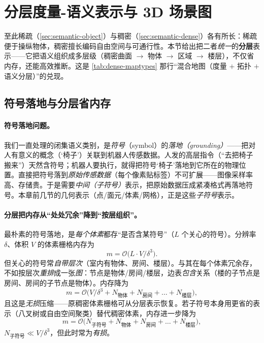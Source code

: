 \section{分层度量-语义表示与 3D 场景图}
\label{sec:semantic-graph}

至此稀疏（\cref{sec:semantic-object}）与稠密（\cref{sec:semantic-dense}）各有所长：稀疏便于操纵物体，稠密擅长编码自由空间与可通行性。本节给出把二者\emph{统一}的\textbf{分层}表示——它把语义组织成多层级（稠密曲面 $\to$ 物体 $\to$ 区域 $\to$ 楼层），不仅省内存，还能高效推断。这是 \cref{tab:dense-maptypes} 那行“混合地图（度量 $+$ 拓扑 $+$ 语义分层）”的兑现。

\subsection{符号落地与分层省内存}
\label{sec:semantic-graph-mem}

\paragraph{符号落地问题。}
我们一直处理的闭集语义类别，是\emph{符号}（symbol）的\emph{落地（grounding）}——把对人有意义的概念（‘椅子’）关联到机器人传感数据\cite{harnad1990symbol}。人发的高层指令（“去把椅子搬来”）天然含符号；机器人要执行，就得把符号‘椅子’落地到它所在的物理位置。直接把符号落到\emph{原始传感数据}（每个像素贴标签）不可扩展——图像采样率高、存储贵。于是需要\emph{中间（子符号）}表示，把原始数据压成紧凑格式再落地符号。本章前几节的几何表示（点/面元/体素/网格），正是这些\emph{子符号}表示。

\paragraph{分层把内存从“处处冗余”降到“按层组织”。}
最朴素的符号落地，是\emph{每个体素}都存“是否含某符号”（$L$ 个关心的符号）。分辨率 $\delta$、体积 $V$ 的体素栅格内存为
\begin{equation}
  m=\mathcal{O}\!\big(L\cdot V/\delta^3\big).
  \label{eq:semantic-mem-flat}
\end{equation}
但关心的符号常\emph{自带层次}（室内有物体、房间、楼层）。与其在每个体素冗余存，不如按层次\emph{重排}成一张\emph{图}：节点是物体/房间/楼层，边表\emph{包含}关系（楼的子节点是房间、房间的子节点是物体）\cite{hughes2022hydra}。内存降为
\begin{equation}
  m=\mathcal{O}\!\big(V/\delta^3+N_{\text{物体}}+N_{\text{房间}}+\dots+N_{\text{楼层}}\big),
  \label{eq:semantic-mem-hier}
\end{equation}
且这是\emph{无损}压缩——原稠密体素栅格可从分层表示恢复\cite{hughes2022hydra}。若子符号本身用更省的表示（八叉树或自由空间聚类）替代稠密体素，内存进一步降为
\begin{equation}
  m=\mathcal{O}\!\big(N_{\text{子符号}}+N_{\text{物体}}+N_{\text{房间}}+\dots+N_{\text{楼层}}\big),
  \label{eq:semantic-mem-lossy}
\end{equation}
$N_{\text{子符号}}\ll V/\delta^3$，但此时常为\emph{有损}\cite{hughes2022hydra}。

